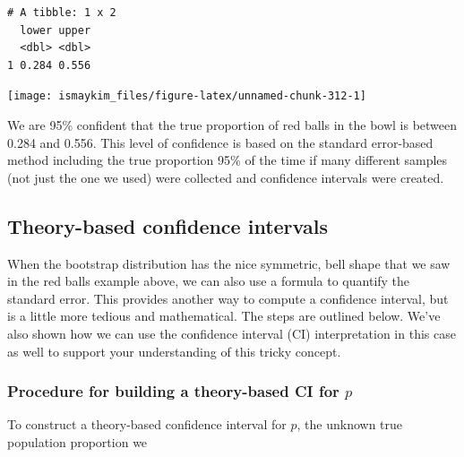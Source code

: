 \documentclass[12pt, krantz2,]{krantz}
\makeatletter
\newenvironment{Shaded}{\begin{snugshade}}{\end{snugshade}}
\newcommand{\DataTypeTok}[1]{\textcolor[rgb]{0.27,0.27,0.27}{#1}}
\newcommand{\DecValTok}[1]{\textcolor[rgb]{0.06,0.06,0.06}{#1}}
\newcommand{\KeywordTok}[1]{\textcolor[rgb]{0.27,0.27,0.27}{\textbf{#1}}}
\newcommand{\NormalTok}[1]{#1}
\newcommand{\OperatorTok}[1]{\textcolor[rgb]{0.43,0.43,0.43}{\textbf{#1}}}
\newcommand{\StringTok}[1]{\textcolor[rgb]{0.5,0.5,0.5}{#1}}
\newenvironment{kframe}{%
\medskip{}
\setlength{\fboxsep}{.8em}
 \def\at@end@of@kframe{}%
 \ifinner\ifhmode%
  \def\at@end@of@kframe{\end{minipage}}%
  \begin{minipage}{\columnwidth}%
 \fi\fi%
 \def\FrameCommand##1{\hskip\@totalleftmargin \hskip-\fboxsep
 \colorbox{shadecolor}{##1}\hskip-\fboxsep
     \hskip-\linewidth \hskip-\@totalleftmargin \hskip\columnwidth}%
 \MakeFramed {\advance\hsize-\width
   \@totalleftmargin\z@ \linewidth\hsize
   \@setminipage}}%
 {\par\unskip\endMakeFramed%
 \at@end@of@kframe}
\renewenvironment{Shaded}{\begin{kframe}}{\end{kframe}}
\makeatother
\begin{document}
\begin{verbatim}
# A tibble: 1 x 2
  lower upper
  <dbl> <dbl>
1 0.284 0.556
\end{verbatim}

\begin{Shaded}
\end{Shaded}

\begin{center}\texttt{[image: ismaykim\_files/figure-latex/unnamed-chunk-312-1]} \end{center}

We are 95\% confident that the true proportion of red balls in the bowl is between 0.284 and 0.556. This level of confidence is based on the standard error-based method including the true proportion 95\% of the time if many different samples (not just the one we used) were collected and confidence intervals were created.

\hypertarget{theory-based-confidence-intervals}{%
\subsection{Theory-based confidence intervals}\label{theory-based-confidence-intervals}}

When the bootstrap distribution has the nice symmetric, bell shape that we saw in the red balls example above, we can also use a formula to quantify the standard error. This provides another way to compute a confidence interval, but is a little more tedious and mathematical. The steps are outlined below. We've also shown how we can use the confidence interval (CI) interpretation in this case as well to support your understanding of this tricky concept.

\hypertarget{procedure-for-building-a-theory-based-ci-for-p}{%
\subsubsection*{\texorpdfstring{Procedure for building a theory-based CI for \(p\)}{Procedure for building a theory-based CI for p}}\label{procedure-for-building-a-theory-based-ci-for-p}}


To construct a theory-based confidence interval for \(p\), the unknown true population proportion we
\end{document}
